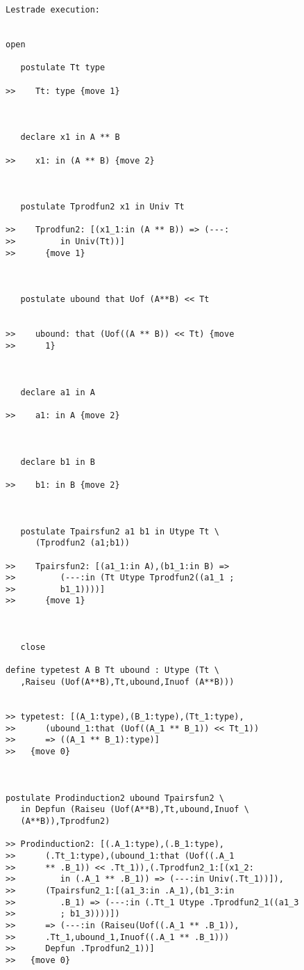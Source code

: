\documentclass{article}
\begin{document}
\begin{verbatim}Lestrade execution:


open

   postulate Tt type

>>    Tt: type {move 1}



   declare x1 in A ** B

>>    x1: in (A ** B) {move 2}



   postulate Tprodfun2 x1 in Univ Tt

>>    Tprodfun2: [(x1_1:in (A ** B)) => (---:
>>         in Univ(Tt))]
>>      {move 1}



   postulate ubound that Uof (A**B) << Tt


>>    ubound: that (Uof((A ** B)) << Tt) {move
>>      1}



   declare a1 in A

>>    a1: in A {move 2}



   declare b1 in B

>>    b1: in B {move 2}



   postulate Tpairsfun2 a1 b1 in Utype Tt \
      (Tprodfun2 (a1;b1))

>>    Tpairsfun2: [(a1_1:in A),(b1_1:in B) =>
>>         (---:in (Tt Utype Tprodfun2((a1_1 ;
>>         b1_1))))]
>>      {move 1}



   close

define typetest A B Tt ubound : Utype (Tt \
   ,Raiseu (Uof(A**B),Tt,ubound,Inuof (A**B)))


>> typetest: [(A_1:type),(B_1:type),(Tt_1:type),
>>      (ubound_1:that (Uof((A_1 ** B_1)) << Tt_1))
>>      => ((A_1 ** B_1):type)]
>>   {move 0}



postulate Prodinduction2 ubound Tpairsfun2 \
   in Depfun (Raiseu (Uof(A**B),Tt,ubound,Inuof \
   (A**B)),Tprodfun2)

>> Prodinduction2: [(.A_1:type),(.B_1:type),
>>      (.Tt_1:type),(ubound_1:that (Uof((.A_1
>>      ** .B_1)) << .Tt_1)),(.Tprodfun2_1:[(x1_2:
>>         in (.A_1 ** .B_1)) => (---:in Univ(.Tt_1))]),
>>      (Tpairsfun2_1:[(a1_3:in .A_1),(b1_3:in
>>         .B_1) => (---:in (.Tt_1 Utype .Tprodfun2_1((a1_3
>>         ; b1_3))))])
>>      => (---:in (Raiseu(Uof((.A_1 ** .B_1)),
>>      .Tt_1,ubound_1,Inuof((.A_1 ** .B_1)))
>>      Depfun .Tprodfun2_1))]
>>   {move 0}


\end{verbatim}
\end{document}

